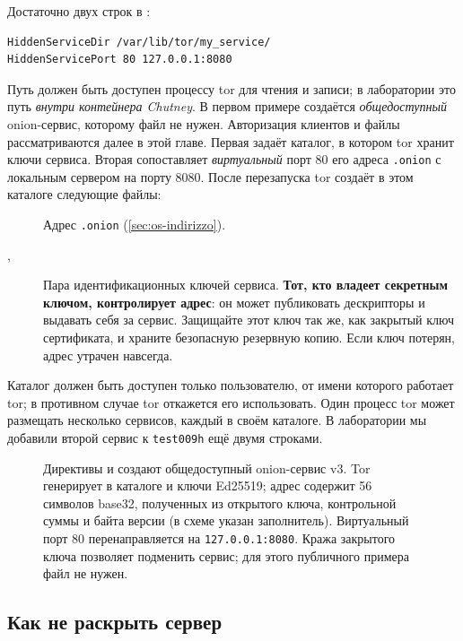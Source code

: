 Достаточно двух строк в :
\begin{lstlisting}[language=torrc]
HiddenServiceDir /var/lib/tor/my_service/
HiddenServicePort 80 127.0.0.1:8080
\end{lstlisting}
Путь  должен быть доступен процессу tor для чтения и записи; в лаборатории это путь \emph{внутри контейнера Chutney}. В первом примере создаётся \emph{общедоступный} onion-сервис, которому файл  не нужен. Авторизация клиентов и файлы  рассматриваются далее в этой главе.
Первая задаёт каталог, в котором tor хранит ключи сервиса. Вторая сопоставляет \emph{виртуальный} порт 80 его адреса \texttt{.onion} с локальным сервером на порту 8080. После перезапуска tor создаёт в этом каталоге следующие файлы:
\begin{description}
  \item[] Адрес \texttt{.onion} (\cref{sec:os-indirizzo}).
  \item[, ] Пара идентификационных ключей сервиса. \textbf{Тот, кто владеет секретным ключом, контролирует адрес}: он может публиковать дескрипторы и выдавать себя за сервис. Защищайте этот ключ так же, как закрытый ключ сертификата, и храните безопасную резервную копию. Если ключ потерян, адрес утрачен навсегда.
\end{description}
Каталог должен быть доступен только пользователю, от имени которого работает tor; в противном случае tor откажется его использовать. Один процесс tor может размещать несколько сервисов, каждый в своём каталоге. В лаборатории мы добавили второй сервис к \texttt{test009h} ещё двумя строками.

\begin{figure}[htbp]
\centering

\caption{Директивы  и  создают общедоступный onion-сервис v3. Tor генерирует в каталоге  и ключи Ed25519; адрес содержит 56 символов base32, полученных из открытого ключа, контрольной суммы и байта версии (в схеме указан заполнитель). Виртуальный порт 80 перенаправляется на \texttt{127.0.0.1:8080}. Кража закрытого ключа позволяет подменить сервис; для этого публичного примера файл  не нужен.}
\label{fig:servizio}
\end{figure}

\subsection{Как не раскрыть сервер}

